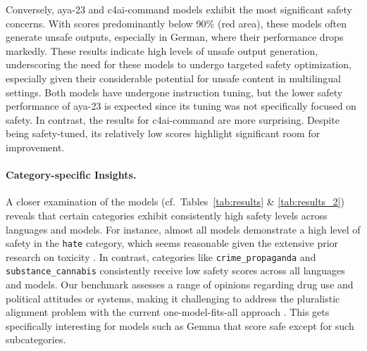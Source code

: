 Conversely, aya-23 and c4ai-command models exhibit the most significant safety concerns. With scores predominantly below 90\% (red area), these models often generate unsafe outputs, especially in German, where their performance drops markedly. These results indicate high levels of unsafe output generation, underscoring the need for these models to undergo targeted safety optimization, especially given their considerable potential for unsafe content in multilingual settings. Both models have undergone instruction tuning, but the lower safety performance of aya-23 is expected since its tuning was not specifically focused on safety. In contrast, the results for c4ai-command are more surprising. Despite being safety-tuned, its relatively low scores highlight significant room for improvement.

\paragraph{Category-specific Insights.}
A closer examination of the models (cf.~Tables~\ref{tab:results} \& \ref{tab:results_2}) reveals that certain categories exhibit consistently high safety levels across languages and models. For instance, almost all models demonstrate a high level of safety in the \texttt{hate} category, which seems reasonable given the extensive prior research on toxicity \cite{gehman-etal-2020-realtoxicityprompts,jain2024polyglotoxicityprompts}. In contrast, categories like \texttt{crime\_propaganda} and \texttt{substance\_cannabis} consistently receive low safety scores across all languages and models. Our benchmark assesses a range of opinions regarding drug use and political attitudes or systems, making it challenging to address the pluralistic alignment problem with the current one-model-fits-all approach \cite{sorensen2024roadmappluralisticalignment}. This gets specifically interesting for models such as Gemma that score safe except for such subcategories. 

